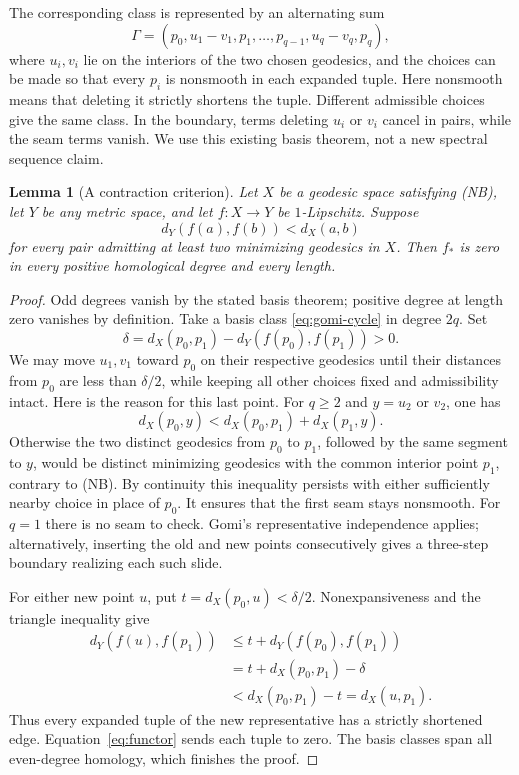 \documentclass[12pt]{amsart}
\newtheorem{lem}[thm]{Lemma}
\theoremstyle{definition}
\theoremstyle{remark}
\numberwithin{equation}{section}
\begin{document}
The corresponding class is represented by an alternating sum
\begin{equation}\label{eq:gomi-cycle}
 \Gamma=(p_0,u_1-v_1,p_1,\ldots,p_{q-1},u_q-v_q,p_q),
\end{equation}
where $u_i,v_i$ lie on the interiors of the two chosen geodesics, and the choices can be made so that every $p_i$ is nonsmooth in each expanded tuple. Here nonsmooth means that deleting it strictly shortens the tuple. Different admissible choices give the same class. In the boundary, terms deleting $u_i$ or $v_i$ cancel in pairs, while the seam terms vanish. We use this existing basis theorem, not a new spectral sequence claim.

\begin{lem}[A contraction criterion]\label{lem:contraction}
Let $X$ be a geodesic space satisfying (NB), let $Y$ be any metric space, and let $f:X\to Y$ be $1$-Lipschitz. Suppose
\begin{equation}\label{eq:cut-contraction}
 d_Y(f(a),f(b))<d_X(a,b)
\end{equation}
for every pair admitting at least two minimizing geodesics in $X$. Then $f_*$ is zero in every positive homological degree and every length.
\end{lem}
\begin{proof}
Odd degrees vanish by the stated basis theorem; positive degree at length zero vanishes by definition. Take a basis class \eqref{eq:gomi-cycle} in degree $2q$. Set
\[
 \delta=d_X(p_0,p_1)-d_Y(f(p_0),f(p_1))>0.
\]
We may move $u_1,v_1$ toward $p_0$ on their respective geodesics until their distances from $p_0$ are less than $\delta/2$, while keeping all other choices fixed and admissibility intact. Here is the reason for this last point. For $q\ge2$ and $y=u_2$ or $v_2$, one has
\[
 d_X(p_0,y)<d_X(p_0,p_1)+d_X(p_1,y).
\]
Otherwise the two distinct geodesics from $p_0$ to $p_1$, followed by the same segment to $y$, would be distinct minimizing geodesics with the common interior point $p_1$, contrary to (NB). By continuity this inequality persists with either sufficiently nearby choice in place of $p_0$. It ensures that the first seam stays nonsmooth. For $q=1$ there is no seam to check. Gomi's representative independence applies; alternatively, inserting the old and new points consecutively gives a three-step boundary realizing each such slide.

For either new point $u$, put $t=d_X(p_0,u)<\delta/2$. Nonexpansiveness and the triangle inequality give
\begin{align*}
 d_Y(f(u),f(p_1))&\le t+d_Y(f(p_0),f(p_1))\\
 &=t+d_X(p_0,p_1)-\delta\\
 &<d_X(p_0,p_1)-t=d_X(u,p_1).
\end{align*}
Thus every expanded tuple of the new representative has a strictly shortened edge. Equation~\eqref{eq:functor} sends each tuple to zero. The basis classes span all even-degree homology, which finishes the proof.
\end{proof}
\end{document}
